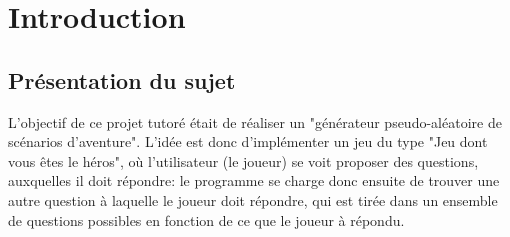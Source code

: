 \section{Introduction}
\subsection{Présentation du sujet}
L'objectif de ce projet tutoré était de réaliser un "générateur pseudo-aléatoire de scénarios d'aventure". L'idée est donc d'implémenter un jeu du type "Jeu dont vous êtes le héros", où l'utilisateur (le joueur) se voit proposer des questions, auxquelles il doit répondre: le programme se charge donc ensuite de trouver une autre question à laquelle le joueur doit répondre, qui est tirée dans un ensemble de questions possibles en fonction de ce que le joueur à répondu.

